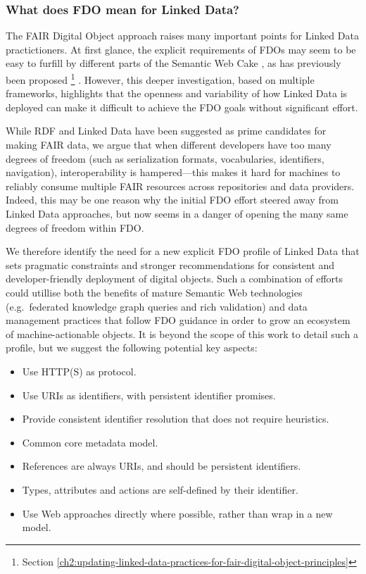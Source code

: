 \subsubsection{What does FDO mean for Linked Data?}\label{ch3:what-does-it-mean-for-linked-data}

The FAIR Digital Object approach raises many important points for Linked Data practictioners.
At first glance, the explicit requirements of FDOs may seem to be easy to furfill by different parts of the Semantic Web Cake \cite[slide 10]{Berners-Lee 2000}, as has previously been proposed \cite{Soiland-Reyes 2022d}\footnote{Section \vref{ch2:updating-linked-data-practices-for-fair-digital-object-principles}} .
However, this deeper investigation, based on multiple frameworks, highlights that the openness and variability of how Linked Data is deployed can make it difficult to achieve the FDO goals without significant effort.

While RDF and Linked Data have been suggested as prime candidates for making FAIR data, we argue that when different developers have too many degrees of freedom (such as serialization formats, vocabularies, identifiers, navigation), interoperability is hampered---this makes it hard for machines to reliably consume multiple FAIR resources across repositories and data providers. 
Indeed, this may be one reason why the initial FDO effort steered away from Linked Data approaches, but now seems in a danger of opening the many same degrees of freedom within FDO.

We therefore identify the need for a new explicit FDO profile of Linked Data that sets pragmatic constraints and stronger recommendations for consistent and developer-friendly deployment of digital objects. 
Such a combination of efforts could utillise both the benefits of mature Semantic Web technologies (e.g.~federated knowledge graph queries and rich validation) and data management practices that follow FDO guidance in order to grow an ecosystem of machine-actionable objects. 
It is beyond the scope of this work to detail such a profile, but we suggest the following potential key aspects:

\begin{itemize}
  \item Use HTTP(S) as protocol.
  \item Use URIs as identifiers, with persistent identifier promises.
  \item Provide consistent identifier resolution that does not require heuristics.
  \item Common core metadata model.
  \item References are always URIs, and should be persistent identifiers.
  \item Types, attributes and actions are self-defined by their identifier.
  \item Use Web approaches directly where possible, rather than wrap in a new model.
\end{itemize}

